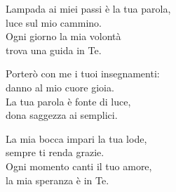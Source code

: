 

\spazio

\strofa Lampada ai miei passi è la tua parola,\\
luce sul mio cammino.\\
Ogni giorno la mia volontà\\
trova una guida in Te.

\spazio


\spazio

\strofa Porterò con me i tuoi insegnamenti:\\
danno al mio cuore gioia.\\
La tua parola è fonte di luce,\\
dona saggezza ai semplici.

\spazio


\spazio

\strofa La mia bocca impari la tua lode,\\
sempre ti renda grazie.\\
Ogni momento canti il tuo amore,\\
la mia speranza è in Te.

\spazio

